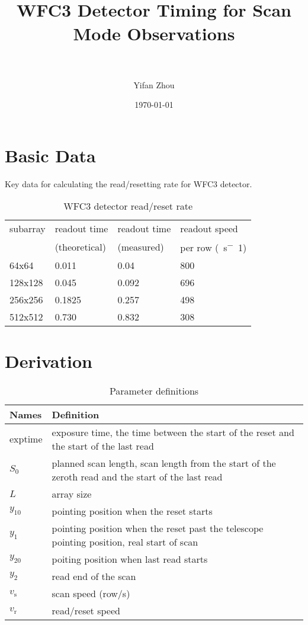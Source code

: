 \documentclass[paper=letter, fontsize=11pt]{scrartcl} %
\title{	
  \normalfont \normalsize 
  \horrule{0.5pt} \\[0.4cm] %
  \huge  WFC3 Detector Timing for Scan Mode Observations\\ %
  \horrule{2pt} \\[0.5cm] %
}
\author{Yifan Zhou} %
\date{\normalsize\today} %
\begin{document}
\maketitle
\section{Basic Data}
Key data for calculating the read/resetting rate for WFC3 detector.
\begin{table}[!h]
  \centering
  \caption{WFC3 detector read/reset rate}
  \begin{tabular}{llll}
    \toprule
    subarray&readout time &readout time &readout speed \\
    ~&(theoretical)& (measured)&per row (\SI{}{s^-1})\\
    \midrule
    64x64&0.011&0.04&\SI{800}{} \\
    128x128&0.045&0.092&\SI{696}{}\\
    256x256&0.1825&0.257&\SI{498}{}\\
    512x512&0.730&0.832&\SI{308}{}\\
    \bottomrule
  \end{tabular}
  \label{tab:data}
\end{table}
\section{Derivation}
\newcommand{\vs}{\ensuremath{v_\mathrm{s}\xspace}}
\newcommand{\vr}{\ensuremath{v_\mathrm{r}\xspace}}
\begin{table}[h]
  \centering
  \caption{Parameter definitions}
  \begin{tabular}{ll}
    \toprule
    Names&Definition\\
    \midrule
    exptime& exposure time, the time between the start of the reset and the start of the last read\\
    $S_{0}$ & planned scan length, scan length from the start of the zeroth read and the start of the last read\\
    $L$ & array size\\
    $y_{10}$& pointing position when the reset starts \\
    $y_{1}$& pointing position when the reset past the telescope pointing position, real start of scan\\
    $y_{20}$& poiting position when last read starts\\
    $y_2$ & read end of the scan\\
    \vs & scan speed (row/s)\\
    \vr & read/reset speed\\
          \bottomrule
  \end{tabular}
  \label{tab:def}
\end{table}
\end{document}
